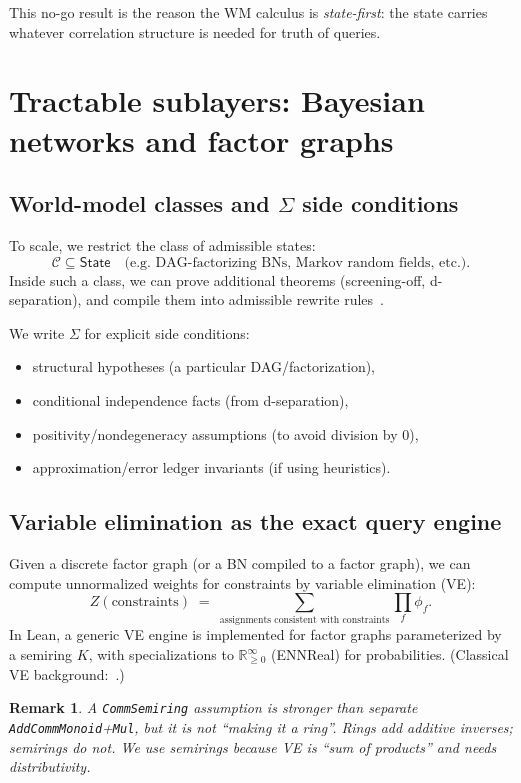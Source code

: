 \documentclass[11pt]{article}
\newtheorem{remark}{Remark}
\newcommand{\State}{\mathsf{State}}
\newcommand{\side}{\Sigma}
\begin{document}
This no-go result is the reason the WM calculus is \emph{state-first}:
the state carries whatever correlation structure is needed for truth of queries.

\section{Tractable sublayers: Bayesian networks and factor graphs}

\subsection{World-model classes and $\Sigma$ side conditions}

To scale, we restrict the class of admissible states:
\[
  \mathcal{C} \subseteq \State \quad \text{(e.g.\ DAG-factorizing BNs, Markov random fields, etc.)}.
\]
Inside such a class, we can prove additional theorems (screening-off, d-separation),
and compile them into admissible rewrite rules~\cite{Pearl}.

We write $\side$ for explicit side conditions:
\begin{itemize}[leftmargin=2em]
\item structural hypotheses (a particular DAG/factorization),
\item conditional independence facts (from d-separation),
\item positivity/nondegeneracy assumptions (to avoid division by $0$),
\item approximation/error ledger invariants (if using heuristics).
\end{itemize}

\subsection{Variable elimination as the exact query engine}

Given a discrete factor graph (or a BN compiled to a factor graph), we can compute
unnormalized weights for constraints by variable elimination (VE):
\[
  Z(\text{constraints}) \;=\; \sum_{\text{assignments consistent with constraints}} \prod_f \phi_f.
\]
In Lean, a generic VE engine is implemented for factor graphs parameterized by a semiring $K$,
with specializations to $\mathbb{R}_{\ge 0}^\infty$ (ENNReal) for probabilities.
(Classical VE background:~\cite{Dechter}.)

\begin{remark}
A \texttt{CommSemiring} assumption is \emph{stronger} than separate \texttt{AddCommMonoid}+\texttt{Mul},
but it is not ``making it a ring''. Rings add additive inverses; semirings do not.
We use semirings because VE is ``sum of products'' and needs distributivity.
\end{remark}
\end{document}

